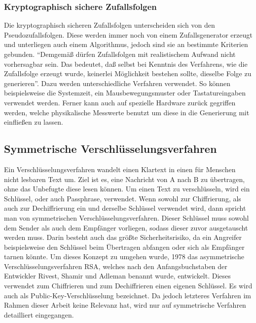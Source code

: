 \subsubsection{Kryptographisch sichere Zufallsfolgen}
\label{sicherzufallsfolgen}
Die kryptographisch sicheren Zufallsfolgen unterscheiden sich von den Pseudozufallsfolgen.
Diese werden immer noch von einem Zufallsgenerator erzeugt und unterliegen auch einem Algorithmus, jedoch sind sie an bestimmte Kriterien gebunden\cite[vgl.][Seite 63 ff.]{ling02}.
"`Demgemäß dürfen Zufallsfolgen mit realistischem Aufwand nicht vorhersagbar sein. Das bedeutet, daß selbst bei Kenntnis des Verfahrens, wie die Zufallsfolge erzeugt wurde, keinerlei Möglichkeit bestehen sollte, dieselbe Folge zu generieren"'\cite[Seite 63]{ling02}.
Dazu werden unterschiedliche Verfahren verwendet.
So können beispielsweise die Systemzeit, ein Mausbewegungsmuster oder Tastatureingaben verwendet werden.
Ferner kann auch auf spezielle Hardware zurück gegriffen werden, welche physikalische Messwerte benutzt um diese in die Generierung mit einfließen zu lassen\cite[vgl.][Seite 63 ff.]{ling02}.

\subsection{Symmetrische Verschlüsselungsverfahren}
\label{symmetrischekrypto}
Ein Verschlüsselungsverfahren wandelt einen Klartext in einen für Menschen nicht lesbaren Text um\cite[vgl.][Seite 15]{ling02}.
Ziel ist es, eine Nachricht von A nach B zu übertragen, ohne das Unbefugte diese lesen können.
Um einen Text zu verschlüsseln, wird ein Schlüssel, oder auch Passphrase, verwendet.
Wenn sowohl zur Chiffrierung, als auch zur Dechiffrierung ein und derselbe Schlüssel verwendet wird, dann spricht man von symmetrischen Verschlüsselungsverfahren\cite[vgl.][Seite 69]{ling02}.
Dieser Schlüssel muss sowohl dem Sender als auch dem Empfänger vorliegen, sodass dieser zuvor ausgetauscht werden muss.
Darin besteht auch das größte Sicherheitsrisiko, da ein Angreifer beispielsweise den Schlüssel beim Übertragen abfangen oder sich als Empfänger tarnen könnte\cite[vgl.][Seite 69]{ling02}.
Um dieses Konzept zu umgehen wurde, 1978 das asymmetrische Verschlüsselungsverfahren RSA, welches nach den Anfangsbuchstaben der Entwickler Rivest, Shamir und Adleman benannt wurde, entwickelt\cite[vgl.][Seite 115]{ling02}.
Dieses verwendet zum Chiffrieren und zum Dechiffrieren einen eigenen Schlüssel.
Es wird auch als Public-Key-Verschlüsselung bezeichnet\cite[vgl.][Seite 110]{ling02}.
Da jedoch letzteres Verfahren im Rahmen dieser Arbeit keine Relevanz hat, wird nur auf symmetrische Verfahren detailliert eingegangen.

